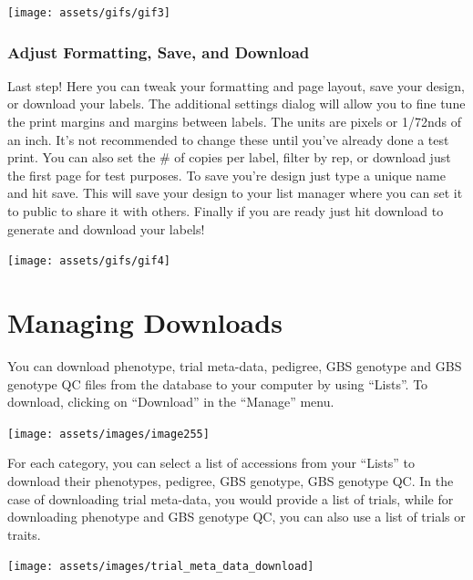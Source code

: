 \documentclass[
  12pt,
]{book}
\begin{document}
\begin{center}\texttt{[image: assets/gifs/gif3]} \end{center}

\hypertarget{adjust-formatting-save-and-download}{%
\subsection{Adjust Formatting, Save, and Download}\label{adjust-formatting-save-and-download}}

Last step! Here you can tweak your formatting and page layout, save your design, or download your labels. The additional settings dialog will allow you to fine tune the print margins and margins between labels. The units are pixels or 1/72nds of an inch. It's not recommended to change these until you've already done a test print. You can also set the \# of copies per label, filter by rep, or download just the first page for test purposes. To save you're design just type a unique name and hit save. This will save your design to your list manager where you can set it to public to share it with others. Finally if you are ready just hit download to generate and download your labels!

\begin{center}\texttt{[image: assets/gifs/gif4]} \end{center}

\hypertarget{managing-downloads}{%
\chapter{Managing Downloads}\label{managing-downloads}}

You can download phenotype, trial meta-data, pedigree, GBS genotype and GBS genotype QC files from the database to your computer by using ``Lists''. To download, clicking on ``Download'' in the ``Manage'' menu.

\begin{center}\texttt{[image: assets/images/image255]} \end{center}

For each category, you can select a list of accessions from your ``Lists'' to download their phenotypes, pedigree, GBS genotype, GBS genotype QC. In the case of downloading trial meta-data, you would provide a list of trials, while for downloading phenotype and GBS genotype QC, you can also use a list of trials or traits.

\begin{center}\texttt{[image: assets/images/trial\_meta\_data\_download]} \end{center}
\end{document}
